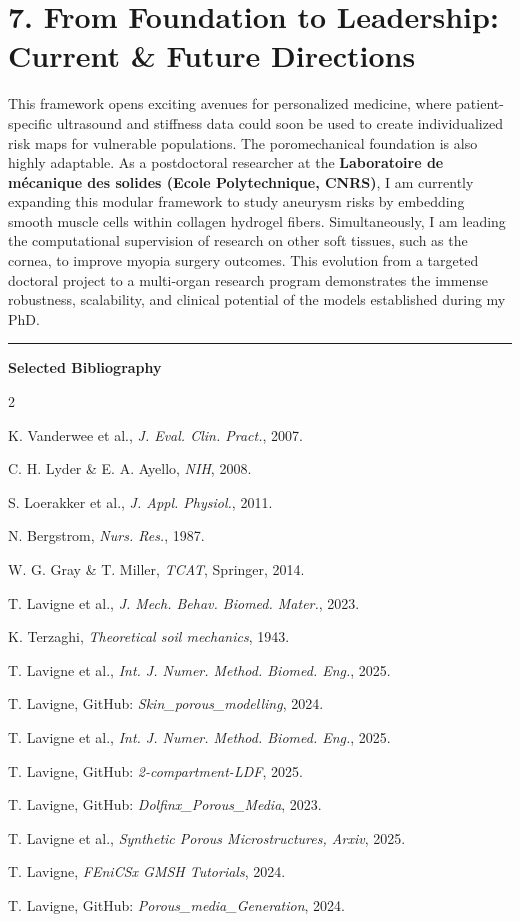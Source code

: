 \documentclass[11pt, a4paper]{article}
\begin{document}
\section*{7. From Foundation to Leadership: Current \& Future Directions}
This framework opens exciting avenues for personalized medicine, where patient-specific ultrasound and stiffness data could soon be used to create individualized risk maps for vulnerable populations. 
The poromechanical foundation is also highly adaptable. As a postdoctoral researcher at the \textbf{Laboratoire de mécanique des solides (Ecole Polytechnique, CNRS)}, I am currently expanding this modular framework to study aneurysm risks by embedding smooth muscle cells within collagen hydrogel fibers. 
Simultaneously, I am leading the computational supervision of research on other soft tissues, such as the cornea, to improve myopia surgery outcomes. This evolution from a targeted doctoral project to a multi-organ research program demonstrates the immense robustness, scalability, and clinical potential of the models established during my PhD.

\vspace{0.3cm}
\noindent\textcolor{accentblue!60}{\rule{\linewidth}{1pt}}
{\footnotesize
\textbf{Selected Bibliography}
\begin{multicols}{2}
\begin{enumerate}[label={[\arabic*]}, leftmargin=2em, itemsep=0pt, parsep=0pt, topsep=0pt]
\item K. Vanderwee et al., \textit{J. Eval. Clin. Pract.}, 2007.
\item C. H. Lyder \& E. A. Ayello, \textit{NIH}, 2008.
\item S. Loerakker et al., \textit{J. Appl. Physiol.}, 2011.
\item N. Bergstrom, \textit{Nurs. Res.}, 1987.
\item W. G. Gray \& T. Miller, \textit{TCAT}, Springer, 2014.
\item T. Lavigne et al., \textit{J. Mech. Behav. Biomed. Mater.}, 2023.
\item K. Terzaghi, \textit{Theoretical soil mechanics}, 1943.
\item T. Lavigne et al., \textit{Int. J. Numer. Method. Biomed. Eng.}, 2025.
\item T. Lavigne, GitHub: \textit{Skin\_porous\_modelling}, 2024.
\item T. Lavigne et al., \textit{Int. J. Numer. Method. Biomed. Eng.}, 2025.
\item T. Lavigne, GitHub: \textit{2-compartment-LDF}, 2025.
\item T. Lavigne, GitHub: \textit{Dolfinx\_Porous\_Media}, 2023.
\item T. Lavigne et al., \textit{Synthetic Porous Microstructures, Arxiv}, 2025.
\item T. Lavigne, \textit{FEniCSx GMSH Tutorials}, 2024.
\item T. Lavigne, GitHub: \textit{Porous\_media\_Generation}, 2024.
\end{enumerate}
\end{multicols}
}
\end{document}
